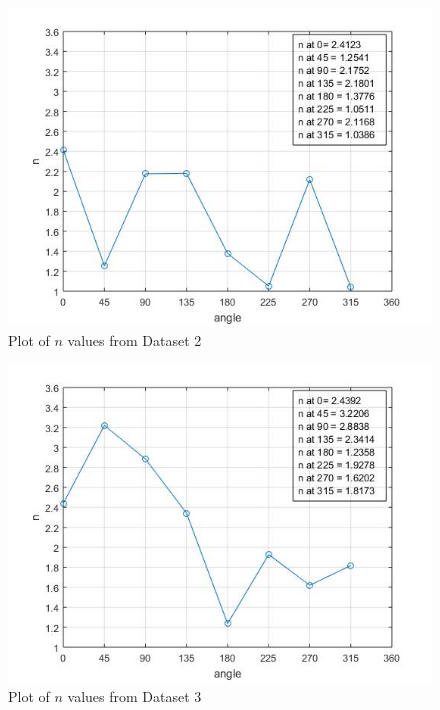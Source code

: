 \begin{figure}[H]
\centering
\includegraphics[width=\textwidth]{Image/pltN2.jpg}
\caption{Plot of $n$ values from Dataset 2}
\label{}
\end{figure}

\begin{figure}[H]
\centering
\includegraphics[width=\textwidth]{Image/pltN3.jpg}
\caption{Plot of $n$ values from Dataset 3}
\label{}
\end{figure}

